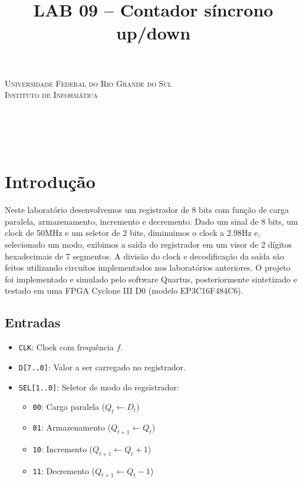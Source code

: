 \documentclass[12pt, fleqn]{article}
\title{LAB 09 – Contador síncrono up/down}
\renewcommand{\maketitle}{
    \begin{titlepage}
        \begin{center}
            {\scshape Universidade Federal do Rio Grande do Sul\\Instituto de Informática} \\
            \vspace*{\fill}
            {\large \thecourse} \\[16pt]
            {\LARGE \thetitle} \\[36pt]
            \theauthors \\
            \vspace*{\fill}
            \theprofessor \\[2pt]
            \thesemester
        \end{center}
    \end{titlepage}
}
\begin{document}
\maketitle

\section{Introdução}

Neste laboratório desenvolvemos um registrador de 8 bits com função de carga paralela, armazenamento, incremento e decremento. Dado um sinal de 8 bits, um clock de 50MHz e um seletor de 2 bits, diminuimos o clock a 2.98Hz e, selecionado um modo, exibimos a saída do registrador em um visor de 2 dígitos hexadecimais de 7 segmentos. A divisão do clock e decodificação da saída são feitos utilizando circuitos implementados nos laboratórios anteriores. O projeto foi implementado e simulado pelo software Quartus, posteriormente sintetizado e testado em uma FPGA Cyclone III D0 (modelo EP3C16F484C6).

\subsection{Entradas}

\begin{itemize}
    \item \texttt{CLK}:\hspace{3pt} Clock com frequência $f$.
    \item \texttt{D[7..0]}:\hspace{3pt} Valor a ser carregado no registrador.
    \item \texttt{SEL[1..0]}:\hspace{3pt} Seletor de modo do regsistrador:
    \begin{itemize}[label=$\circ$]
        \item \texttt{00}:\hspace{3pt} Carga paralela ($Q_t \leftarrow D_t$)
        \item \texttt{01}:\hspace{3pt} Armazenamento ($Q_{t+1} \leftarrow Q_t$)
        \item \texttt{10}:\hspace{3pt} Incremento ($Q_{t+1} \leftarrow Q_t + 1$)
        \item \texttt{11}:\hspace{3pt} Decremento ($Q_{t+1} \leftarrow Q_t - 1$)
    \end{itemize}
\end{itemize}
\end{document}
